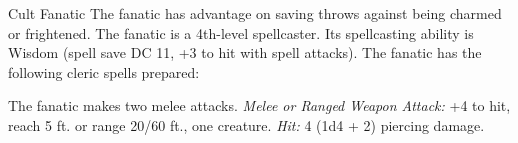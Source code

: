 \documentclass[10pt,a4paper,twoside,twocolumn,openany,bg=print,nodeprecatedcode]{dndbook}
\begin{document}
\begin{DndMonster}[float*=t]{Cult Fanatic}
\DndMonsterBasics[
armor-class = {13 (leather armor)},
hit-points = {\DndDice{6d8 + 6}},
speed = {30 ft.}
]
\DndMonsterAbilityScores[
 str = 11,
 dex = 14,
 con = 12,
 int = 10,
 wis = 13,
 cha = 14
]
\DndMonsterDetails[
skills = {Deception +4, Persuasion +4, Religion +2},
languages = {any one language (usually Common)},
challenge = 2,
]
The fanatic has advantage on saving throws against being charmed or frightened.
The fanatic is a 4th-level spellcaster. Its spellcasting ability is Wisdom (spell save DC 11, +3 to hit with spell attacks). The fanatic has the following cleric spells prepared:
\begin{DndMonsterSpells}
\end{DndMonsterSpells}
\par
{}
The fanatic makes two melee attacks.
\textsl{Melee or Ranged Weapon Attack:} +4 to hit, reach 5 ft. or range 20/60 ft., one creature. \textsl{Hit:} 4 (1d4 + 2) piercing damage.
\end{DndMonster}
\end{document}
